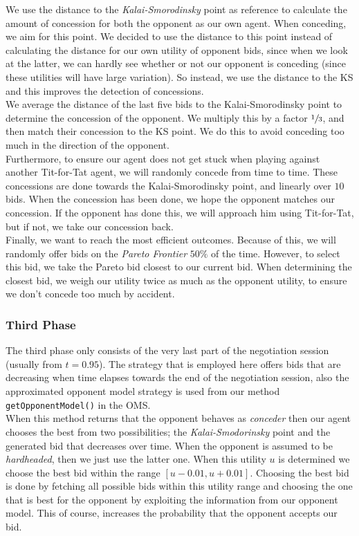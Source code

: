 We use the distance to the \emph{Kalai-Smorodinsky} point as reference to calculate
the amount of concession for both the opponent as our own agent. When conceding, we aim for this point.
We decided to use the distance to this point instead of calculating the distance for our own utility of opponent bids, since when we look at the latter, we can hardly see whether or not
our opponent is conceding (since these utilities will have large variation). So instead, we use the distance to the KS and this improves the detection of concessions. \\

We average the distance of the last five bids to the Kalai-Smorodinsky point to determine the concession of the opponent. We
multiply this by a factor $\sfrac{1}{3}$, and then match their concession to the KS point.
We do this to avoid conceding too much in the direction of the opponent. \\

Furthermore, to ensure our agent does not get stuck when playing against 
another Tit-for-Tat agent, we will randomly concede from time to time. 
These concessions are done towards the Kalai-Smorodinsky point, and linearly over 
$10$ bids. When the concession has been done, we hope the opponent matches 
our concession. If the opponent has done this, we will approach him
using Tit-for-Tat, but if not, we take our concession back. \\

Finally, we want to reach the most efficient outcomes. Because of this,
we will randomly offer bids on the \emph{Pareto Frontier} $50\%$ of the time.
However, to select this bid, we take the Pareto bid closest to our current bid.
When determining the closest bid, we weigh our utility twice as much
as the opponent utility, to ensure we don't concede too much by accident.

\subsubsection{Third Phase}

The third phase only consists of the very last part of the negotiation session (usually from $t=0.95$). The strategy that is employed here offers bids that are decreasing when time elapses towards the end of the negotiation session, also the approximated opponent model strategy is used from our method \texttt{getOpponentModel()} in the OMS. \\

When this method returns that the opponent behaves as \emph{conceder} then our agent chooses the best from two possibilities; the \emph{Kalai-Smodorinsky} point and the generated bid that decreases over time. When the opponent is assumed to be \emph{hardheaded}, then we just use the latter one. When this utility $u$ is determined we choose the best bid within the range $[u-0.01, u+0.01]$. Choosing the best bid is done by fetching all possible bids within this utility range and choosing the one that is best for the opponent by exploiting the information from our opponent model. This of course, increases the probability that the opponent accepts our bid. \\

